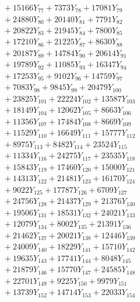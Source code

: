 \documentclass[a4paper,10pt]{article}
\begin{document}
{\begin{align}
&\;  + 15166 Y_{77} + 7373 Y_{78} + 17081 Y_{79} \\[0.3ex]
&\;  + 24880 Y_{80} + 20140 Y_{81} + 7791 Y_{82} \\[0.3ex]
&\;  + 20822 Y_{83} + 21945 Y_{84} + 7800 Y_{85} \\[0.3ex]
&\;  + 17210 Y_{86} + 21225 Y_{87} + 8630 Y_{88} \\[0.5ex]\allowbreak
&\;  + 20187 Y_{89} + 14784 Y_{90} + 20614 Y_{91} \\[0.3ex]
&\;  + 19789 Y_{92} + 11085 Y_{93} + 16347 Y_{94} \\[0.3ex]
&\;  + 17253 Y_{95} + 9102 Y_{96} + 14759 Y_{97} \\[0.3ex]
&\;  + 7083 Y_{98} + 9845 Y_{99} + 20479 Y_{100} \\[0.3ex]
&\;  + 23825 Y_{101} + 22224 Y_{102} + 13587 Y_{103} \\[0.3ex]
&\;  + 18149 Y_{104} + 12062 Y_{105} + 8663 Y_{106} \\[0.3ex]
&\;  + 11356 Y_{107} + 17484 Y_{108} + 8669 Y_{109} \\[0.3ex]
&\;  + 11529 Y_{110} + 16649 Y_{111} + 15777 Y_{112} \\[0.3ex]
&\;  + 8975 Y_{113} + 8482 Y_{114} + 23524 Y_{115} \\[0.3ex]
&\;  + 11334 Y_{116} + 24275 Y_{117} + 23535 Y_{118} \\[0.5ex]\allowbreak
&\;  + 15843 Y_{119} + 17460 Y_{120} + 15000 Y_{121} \\[0.3ex]
&\;  + 14313 Y_{122} + 21481 Y_{123} + 16170 Y_{124} \\[0.3ex]
&\;  + 9022 Y_{125} + 17787 Y_{126} + 6709 Y_{127} \\[0.3ex]
&\;  + 24756 Y_{128} + 21437 Y_{129} + 21376 Y_{130} \\[0.3ex]
&\;  + 19506 Y_{131} + 18531 Y_{132} + 24021 Y_{133} \\[0.3ex]
&\;  + 12079 Y_{134} + 8002 Y_{135} + 21391 Y_{136} \\[0.3ex]
&\;  + 21462 Y_{137} + 20021 Y_{138} + 12446 Y_{139} \\[0.3ex]
&\;  + 24009 Y_{140} + 18229 Y_{141} + 15710 Y_{142} \\[0.3ex]
&\;  + 19635 Y_{143} + 17741 Y_{144} + 8048 Y_{145} \\[0.3ex]
&\;  + 21879 Y_{146} + 15770 Y_{147} + 24585 Y_{148} \\[0.5ex]\allowbreak
&\;  + 22701 Y_{149} + 9225 Y_{150} + 9979 Y_{151} \\[0.3ex]
&\;  + 13739 Y_{152} + 14714 Y_{153} + 22033 Y_{154} \\[0.3ex]

\end{align}}
\end{document}
